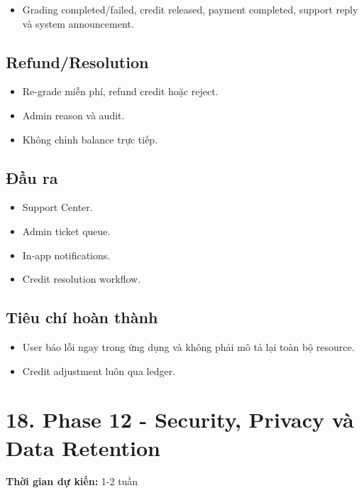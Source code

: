 \documentclass[
  11pt,
  a4paper,
]{article}
\begin{document}
\begin{itemize}
\item
  Grading completed/failed, credit released, payment completed, support
  reply và system announcement.
\end{itemize}

\subsection{Refund/Resolution}\label{refundresolution}

\begin{itemize}
\item
  Re-grade miễn phí, refund credit hoặc reject.
\item
  Admin reason và audit.
\item
  Không chỉnh balance trực tiếp.
\end{itemize}

\subsection{Đầu ra}\label{ux111ux1ea7u-ra-11}

\begin{itemize}
\item
  Support Center.
\item
  Admin ticket queue.
\item
  In-app notifications.
\item
  Credit resolution workflow.
\end{itemize}

\subsection{Tiêu chí hoàn
thành}\label{tiuxeau-chuxed-houxe0n-thuxe0nh-11}

\begin{itemize}
\item
  User báo lỗi ngay trong ứng dụng và không phải mô tả lại toàn bộ
  resource.
\item
  Credit adjustment luôn qua ledger.
\end{itemize}

\section{18. Phase 12 - Security, Privacy và Data
Retention}\label{phase-12---security-privacy-vuxe0-data-retention}

\textbf{Thời gian dự kiến:} 1-2 tuần
\end{document}
